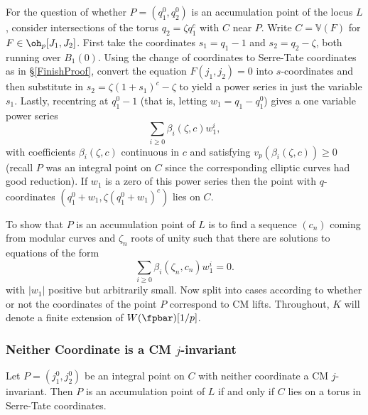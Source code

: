 \documentclass[12pt,letterpaper]{article}
\begin{document}
	
	
	For the question of whether $P=(q_1^0,q_2^0)$ is an accumulation point of the locus $L$, consider intersections of the torus $q_2= \zeta q_1^c$ with $C$ near $P$. Write $C=\mathbb{V}(F)$ for $F\in \oh_p[J_1,J_2]$. First take the coordinates $s_1 = q_1 -1$ and $s_2 = q_2-\zeta$, both running over $B_1(0)$. Using the change of coordinates to Serre-Tate coordinates as in \S\ref{FinishProof}, convert the equation $F(j_1,j_2)=0$ into $s$-coordinates and then substitute in $s_2 = \zeta(1+s_1)^c-\zeta$ to yield a power series in just the variable $s_1$. Lastly, recentring at $q_1^0-1$ (that is, letting $w_1 = q_1-q_1^0$) gives a one variable power series \[\sum_{i\geq0} \beta_i(\zeta,c)w_1^i,\] with coefficients $\beta_i(\zeta,c)$ continuous in $c$ and satisfying $v_p(\beta_i(\zeta,c))\geq 0$ (recall $P$ was an integral point on $C$ since the corresponding elliptic curves had good reduction). If $w_1$ is a zero of this power series then the point with $q$-coordinates $(q_1^0+w_1,\zeta(q_1^0+w_1)^c)$ lies on $C$.
	
	
	
	To show that $P$ is an accumulation point of $L$ is to find a sequence $(c_n)$ coming from modular curves and $\zeta_n$ roots of unity such that there are solutions to equations of the form
	\[\sum_{i\geq0} \beta_i(\zeta_n,c_n)w_1^i=0.\] with $|w_1|$ positive but arbitrarily small. Now split into cases according to whether or not the coordinates of the point $P$ correspond to CM lifts. Throughout, $K$ will denote a finite extension of $W(\fpbar)[1/p]$.

	\subsubsection{Neither Coordinate is a CM $j$-invariant}
	
	\begin{prop} \label{nonCM}
		Let $P=(j_1^0,j_2^0)$ be an integral point on $C$ with neither coordinate a CM $j$-invariant. Then $P$ is an accumulation point of $L$ if and only if $C$ lies on a torus in Serre-Tate coordinates.
	\end{prop}
	
\end{document}
